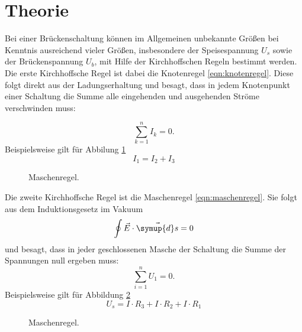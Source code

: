 \section{Theorie}
\label{sec:Theorie}

Bei einer Brückenschaltung können im Allgemeinen unbekannte Größen bei Kenntnis ausreichend vieler Größen, insbesondere der Speisespannung $U_s$ sowie der Brückenspannung $U_b$, mit Hilfe der Kirchhoffschen Regeln bestimmt werden.\\
Die erste Kirchhoffsche Regel ist dabei die Knotenregel \eqref{eqn:knotenregel}.
Diese folgt direkt aus der Ladungserhaltung und besagt, dass in jedem Knotenpunkt einer Schaltung die Summe alle eingehenden und ausgehenden Ströme verschwinden muss:

\begin{equation}
  \sum_{k=1}^n I_k = 0.
  \label{eqn:knotenregel}
\end{equation}
Beispielsweise gilt für Abbilung \ref{fig:knotenregel}
\begin{equation}
I_1 = I_2 + I_3
\end{equation}
\begin{figure}[H]
  \centering
  \caption{Maschenregel.}
  \label{fig:knotenregel}
\end{figure}
Die zweite Kirchhoffsche Regel ist die Maschenregel \eqref{eqn:maschenregel}.
Sie folgt aus dem Induktionsgesetz im Vakuum
\begin{equation}
\oint \vec{E} \cdot \vec{\symup{d}s} = 0
\end{equation}
und besagt, dass in jeder geschlossenen Masche der Schaltung die Summe der Spannungen null ergeben muss:
\begin{equation}
  \sum_{i=1}^n U_1 = 0.
  \label{eqn:maschenregel}
\end{equation}
Beispielsweise gilt für Abbildung \ref{fig:maschenregel}
\begin{equation}
U_s = I \cdot R_3 + I \cdot R_2 + I \cdot R_1
\end{equation}
\begin{figure}[H]
  \centering
    \caption{Maschenregel.}
    \label{fig:maschenregel}
\end{figure}


